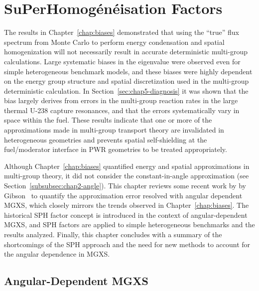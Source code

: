 \chapter{SuPerHomog\'{e}n\'{e}isation Factors}
\label{chap:sph}

The results in Chapter~\ref{chap:biases} demonstrated that using the ``true'' flux spectrum from Monte Carlo to perform energy condensation and spatial homogenization will not necessarily result in accurate deterministic multi-group calculations. Large systematic biases in the eigenvalue were observed even for simple heterogeneous benchmark models, and these biases were highly dependent on the energy group structure and spatial discretization used in the multi-group deterministic calculation. In Section~\ref{sec:chap5-diagnosis} it was shown that the bias largely derives from errors in the multi-group reaction rates in the large thermal U-238 capture resonances, and that the errors systematically vary in space within the fuel. These results indicate that one or more of the approximations made in multi-group transport theory are invalidated in heterogeneous geometries and prevents spatial self-shielding at the fuel/moderator interface in \ac{PWR} geometries to be treated appropriately.

Although Chapter~\ref{chap:biases} quantified energy and spatial approximations in multi-group theory, it did not consider the constant-in-angle approximation (see Section~\ref{subsubsec:chap2-angle}). This chapter reviews some recent work by by Gibson~\cite{gibson2016thesis} to quantify the approximation error resolved with angular dependent \ac{MGXS}, which closely mirrors the trends observed in Chapter~\ref{chap:biases}. The historical \ac{SPH} factor concept is introduced in the context of angular-dependent \ac{MGXS}, and \ac{SPH} factors are applied to simple heterogeneous benchmarks and the results analyzed. Finally, this chapter concludes with a summary of the shortcomings of the \ac{SPH} approach and the need for new methods to account for the angular dependence in \ac{MGXS}.


\section{Angular-Dependent MGXS}
\label{sec:chap6-angular-mgxs}


